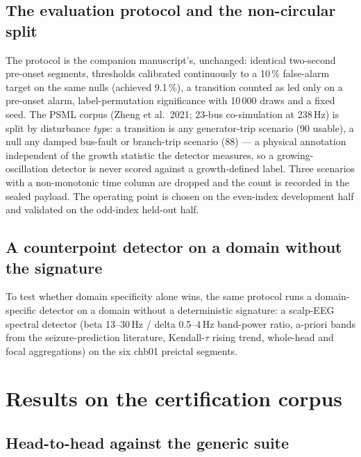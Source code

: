 \documentclass[journal]{IEEEtran}
\begin{document}
\subsection{The evaluation protocol and the non-circular split}

The protocol is the companion manuscript's, unchanged: identical
two-second pre-onset segments, thresholds calibrated continuously to a
10\,\% false-alarm target on the same nulls (achieved 9.1\,\%), a
transition counted as led only on a pre-onset alarm, label-permutation
significance with 10\,000 draws and a fixed seed. The PSML corpus
(Zheng et al.\ 2021; 23-bus co-simulation at 238\,Hz) is split by
disturbance \emph{type}: a transition is any generator-trip scenario
(90 usable), a null any damped bus-fault or branch-trip scenario (88)
--- a physical annotation independent of the growth statistic the
detector measures, so a growing-oscillation detector is never scored
against a growth-defined label. Three scenarios with a non-monotonic
time column are dropped and the count is recorded in the sealed
payload. The operating point is chosen on the even-index development
half and validated on the odd-index held-out half.

\subsection{A counterpoint detector on a domain without the signature}

To test whether domain specificity alone wins, the same protocol runs a
domain-specific detector on a domain without a deterministic signature:
a scalp-EEG spectral detector (beta 13--30\,Hz / delta 0.5--4\,Hz
band-power ratio, a-priori bands from the seizure-prediction
literature, Kendall-$\tau$ rising trend, whole-head and focal
aggregations) on the six chb01 preictal segments.

\section{Results on the certification corpus}\label{sec:grid}

\subsection{Head-to-head against the generic suite}
\end{document}
